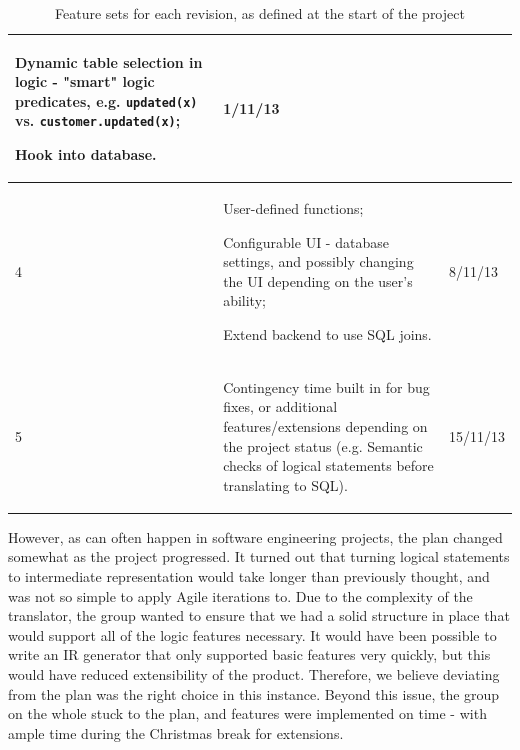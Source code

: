 \documentclass[a4paper, 11pt]{article}
\begin{document}
\begin{table}[H]
\begin{tabular}{| l | p{} | l |}
\begin{compactitem}
            \item Dynamic table selection in logic - "smart" logic predicates,
              e.g. \texttt{updated(x)} vs. \texttt{customer.updated(x)};
            \item Hook into database.
          \end{compactitem}
          & 1/11/13 \\
        \hline
        4 &
          \begin{compactitem}
            \item User-defined functions;
            \item Configurable UI - database settings, and possibly changing the
              UI depending on the user's ability;
            \item Extend backend to use SQL joins.
          \end{compactitem}
          & 8/11/13 \\
        \hline
        5 &
          \begin{compactitem}
            \item Contingency time built in for bug fixes, or additional
              features/extensions depending on the project status (e.g. Semantic
              checks of logical statements before translating to SQL).
          \end{compactitem}
          & 15/11/13 \\
        \hline
      \end{tabular}
      \caption{Feature sets for each revision, as defined at the start of the
        project}
    \end{table}

    However, as can often happen in software engineering projects, the plan
    changed somewhat as the project progressed. It turned out that turning
    logical statements to intermediate representation would take longer than
    previously thought, and was not so simple to apply Agile iterations to. Due
    to the complexity of the translator, the group wanted to ensure that we
    had a solid structure in place that would support all of the logic features
    necessary. It would have been possible to write an IR generator that only
    supported basic features very quickly, but this would have reduced
    extensibility of the product. Therefore, we believe deviating from the plan
    was the right choice in this instance. Beyond this issue, the group on the
    whole stuck to the plan, and features were implemented on time - with ample
    time during the Christmas break for extensions.
\end{document}
